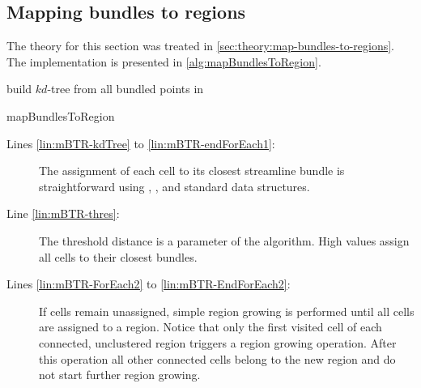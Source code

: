 \subsection{Mapping bundles to regions}
\label{sec:impl:map-bundles-to-regions}

The theory for this section was treated in \autoref{sec:theory:map-bundles-to-regions}. The implementation is presented in \autoref{alg:mapBundlesToRegion}.

\begin{algorithm}[tbhp]
  
  \KwIn{\bundles}
  \KwIn{\mesh}
  \KwOut{\meshPartition}
	\BlankLine
	
	build $kd$-tree from all bundled points in \bundles\;	       \label{lin:mBTR-kdTree}
	                                                     \label{lin:mBTR-endForEach1}
	                                                     \label{lin:mBTR-EndForEach2}
	
	\Return{\meshPartition}\;
		
\caption{mapBundlesToRegion}
\label{alg:mapBundlesToRegion}
\end{algorithm}

\begin{description}
%
	\item[Lines \ref{lin:mBTR-kdTree} to  \ref{lin:mBTR-endForEach1}:] The assignment of each cell to its closest streamline bundle is straightforward using , , and standard \vtk data structures.
%
	\item[Line \ref{lin:mBTR-thres}:] The threshold distance is a parameter of the algorithm. High values assign all cells to their closest bundles.
%
	\item[Lines \ref{lin:mBTR-ForEach2} to \ref{lin:mBTR-EndForEach2}:] If cells remain unassigned, simple region growing is performed until all cells are assigned to a region. Notice that only the first visited cell of each connected, unclustered region triggers a region growing operation. After this operation all other connected cells belong to the new region and do not start further region growing.
%
\end{description}


